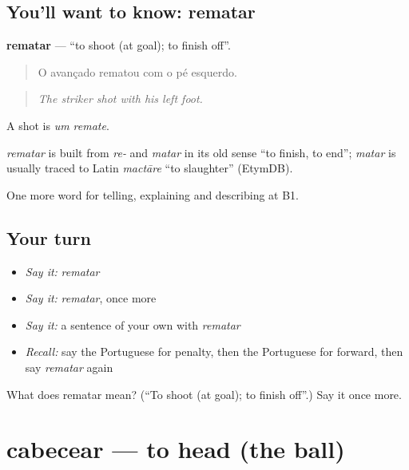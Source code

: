\subsection*{You'll want to know: rematar}
\textbf{rematar} — \textquotedblleft{}to shoot (at goal); to finish off\textquotedblright{}.

\begin{quote}
O avançado rematou com o pé esquerdo.
\end{quote}

\begin{quote}
\emph{The striker shot with his left foot.}
\end{quote}

A shot is \emph{um remate}.

\begin{cousinweb}
\emph{rematar} is built from \emph{re-} and \emph{matar} in its old sense \textquotedblleft{}to finish, to end\textquotedblright{}; \emph{matar} is usually traced to Latin \emph{mactāre} \textquotedblleft{}to slaughter\textquotedblright{} (EtymDB).
\end{cousinweb}

\begin{grammarlens}[title={What you've built}]
One more word for telling, explaining and describing at B1.
\end{grammarlens}

\subsection*{Your turn}
\begin{itemize}
\raggedright
  \item \emph{Say it:} \emph{rematar}
  \item \emph{Say it:} \emph{rematar}, once more
  \item \emph{Say it:} a sentence of your own with \emph{rematar}
  \item \emph{Recall:} say the Portuguese for penalty, then the Portuguese for forward, then say \emph{rematar} again
\end{itemize}

\begin{tcolorbox}[breakable,colback=teal!4,colframe=teal!35!black,title={Before you move on}]
What does rematar mean? (\textquotedblleft{}To shoot (at goal); to finish off\textquotedblright{}.) Say it once more.
\end{tcolorbox}
\section[cabecear]{cabecear — to head (the ball)}

